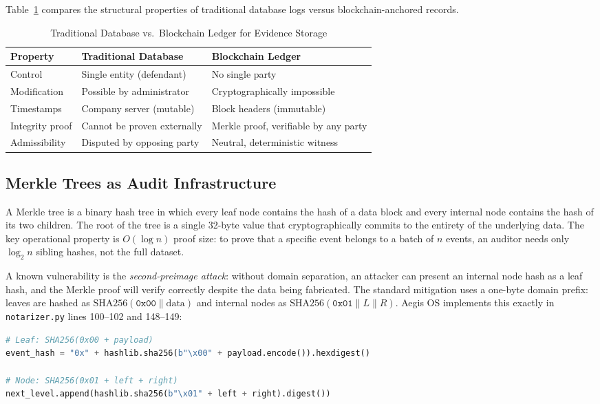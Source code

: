 \documentclass[12pt,a4paper]{article}
\begin{document}
Table~\ref{tab:db-vs-blockchain} compares the structural properties of
traditional database logs versus blockchain-anchored records.

\begin{table}[ht]
\centering
\caption{Traditional Database vs.\ Blockchain Ledger for Evidence Storage}
\label{tab:db-vs-blockchain}
\begin{tabular}{@{}lll@{}}
\toprule
\rowcolor{gray!15}
\textbf{Property} & \textbf{Traditional Database} & \textbf{Blockchain Ledger} \\
\midrule
Control         & Single entity (defendant)       & No single party \\
Modification    & Possible by administrator       & Cryptographically impossible \\
Timestamps      & Company server (mutable)        & Block headers (immutable) \\
Integrity proof & Cannot be proven externally     & Merkle proof, verifiable by any party \\
Admissibility   & Disputed by opposing party      & Neutral, deterministic witness \\
\bottomrule
\end{tabular}
\end{table}

\subsection{Merkle Trees as Audit Infrastructure}
\label{sec:merkle}

A Merkle tree \cite{merkle1987} is a binary hash tree in which every
leaf node contains the hash of a data block and every internal node
contains the hash of its two children. The root of the tree is a single
32-byte value that cryptographically commits to the entirety of the
underlying data. The key operational property is $O(\log n)$ proof size:
to prove that a specific event belongs to a batch of $n$ events, an
auditor needs only $\log_2 n$ sibling hashes, not the full dataset.

A known vulnerability is the \emph{second-preimage attack}: without
domain separation, an attacker can present an internal node hash as a
leaf hash, and the Merkle proof will verify correctly despite the data
being fabricated. The standard mitigation \cite{laurie2012} uses a
one-byte domain prefix: leaves are hashed as
$\text{SHA256}(\texttt{0x00} \| \text{data})$ and internal nodes as
$\text{SHA256}(\texttt{0x01} \| L \| R)$. Aegis OS implements this
exactly in \texttt{notarizer.py} lines 100--102 and 148--149:
\begin{lstlisting}[style=aegiscode, language=Python,
  caption={Domain-separated Merkle hashing in notarizer.py}]
# Leaf: SHA256(0x00 + payload)
event_hash = "0x" + hashlib.sha256(b"\x00" + payload.encode()).hexdigest()

# Node: SHA256(0x01 + left + right)
next_level.append(hashlib.sha256(b"\x01" + left + right).digest())
\end{lstlisting}
\end{document}
